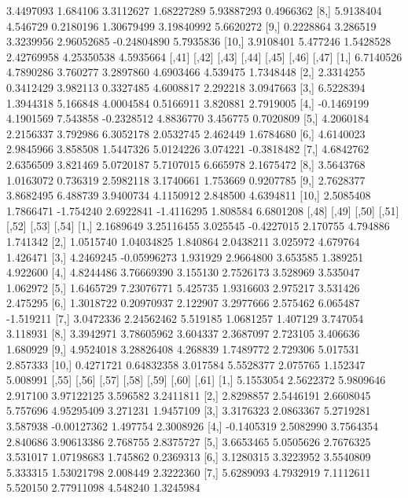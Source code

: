 \documentclass[12pt]{article}
\begin{document}
\begin{Schunk}
\begin{Soutput}
 [7,]  3.4497093 1.684106 3.3112627  1.68227289  5.93887293 0.4966362
 [8,]  5.9138404 4.546729 0.2180196  1.30679499  3.19840992 5.6620272
 [9,]  0.2228864 3.286519 3.3239956  2.96052685 -0.24804890 5.7935836
[10,]  3.9108401 5.477246 1.5428528  2.42769958  4.25350538 4.5935664
           [,41]     [,42]     [,43]      [,44]      [,45]    [,46]      [,47]
 [1,]  6.7140526 4.7890286  3.760277  3.2897860  4.6903466 4.539475  1.7348448
 [2,]  2.3314255 0.3412429  3.982113  0.3327485  4.6008817 2.292218  3.0947663
 [3,]  6.5228394 1.3944318  5.166848  4.0004584  0.5166911 3.820881  2.7919005
 [4,] -0.1469199 4.1901569  7.543858 -0.2328512  4.8836770 3.456775  0.7020809
 [5,]  4.2060184 2.2156337  3.792986  6.3052178  2.0532745 2.462449  1.6784680
 [6,]  4.6140023 2.9845966  3.858508  1.5447326  5.0124226 3.074221 -0.3818482
 [7,]  4.6842762 2.6356509  3.821469  5.0720187  5.7107015 6.665978  2.1675472
 [8,]  3.5643768 1.0163072  0.736319  2.5982118  3.1740661 1.753669  0.9207785
 [9,]  2.7628377 3.8682495  6.488739  3.9400734  4.1150912 2.848500  4.6394811
[10,]  2.5085408 1.7866471 -1.754240  2.6922841 -1.4116295 1.808584  6.6801208
          [,48]       [,49]    [,50]      [,51]    [,52]    [,53]     [,54]
 [1,] 2.1689649  3.25116455 3.025545 -0.4227015 2.170755 4.794886  1.741342
 [2,] 1.0515740  1.04034825 1.840864  2.0438211 3.025972 4.679764  1.426471
 [3,] 4.2469245 -0.05996273 1.931929  2.9664800 3.653585 1.389251  4.922600
 [4,] 4.8244486  3.76669390 3.155130  2.7526173 3.528969 3.535047  1.062972
 [5,] 1.6465729  7.23076771 5.425735  1.9316603 2.975217 3.531426  2.475295
 [6,] 1.3018722  0.20970937 2.122907  3.2977666 2.575462 6.065487 -1.519211
 [7,] 3.0472336  2.24562462 5.519185  1.0681257 1.407129 3.747054  3.118931
 [8,] 3.3942971  3.78605962 3.604337  2.3687097 2.723105 3.406636  1.680929
 [9,] 4.9524018  3.28826408 4.268839  1.7489772 2.729306 5.017531  2.857333
[10,] 0.4271721  0.64832358 3.017584  5.5528377 2.075765 1.152347  5.008991
           [,55]     [,56]     [,57]    [,58]       [,59]    [,60]     [,61]
 [1,]  5.1553054 2.5622372 5.9809646 2.917100  3.97122125 3.596582 3.2411811
 [2,]  2.8298857 2.5446191 2.6608045 5.757696  4.95295409 3.271231 1.9457109
 [3,]  3.3176323 2.0863367 5.2719281 3.587938 -0.00127362 1.497754 2.3008926
 [4,] -0.1405319 2.5082990 3.7564354 2.840686  3.90613386 2.768755 2.8375727
 [5,]  3.6653465 5.0505626 2.7676325 3.531017  1.07198683 1.745862 0.2369313
 [6,]  3.1280315 3.3223952 3.5540809 5.333315  1.53021798 2.008449 2.3222360
 [7,]  5.6289093 4.7932919 7.1112611 5.520150  2.77911098 4.548240 1.3245984

\end{Soutput}
\end{Schunk}
\end{document}
